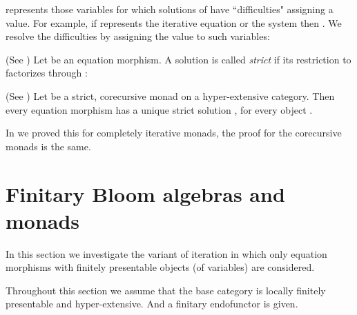 \documentclass{LMCS}
\theoremstyle{plain}
\theoremstyle{definition}
\numberwithin{equation}{section}
\begin{document}
\begin{rem}
 represents those variables for which solutions of  have ``difficulties" assigning a value. For example, if  represents the iterative equation  or the system 
then . We resolve the difficulties by assigning the value  to such variables:
\end{rem}

\begin{defi}(See \cite{abmv_how})
Let  be an equation morphism. A solution  is called {\it strict} if its restriction to  factorizes through :


\end{defi}

\begin{thm}{\rm(}See \cite{abmv_how}{\rm)}\label{the_ equations have strict solutions}
Let  be a strict, corecursive monad on a hyper-extensive category. Then every equation morphism  has a unique strict solution , for every object .

\end{thm}

In \cite{abmv_how} we proved this for completely iterative monads, the proof for the corecursive monads is the same.

\section{Finitary Bloom algebras and monads}

In this section we investigate the variant of iteration in which only equation morphisms  with finitely presentable objects  (of variables) are considered.


Throughout this section we assume that the base category is locally finitely presentable and hyper-extensive. And a finitary endofunctor  is given.
\end{document}
